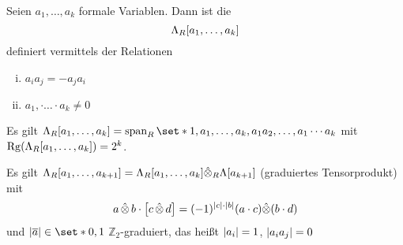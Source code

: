 \begin{definition}
	Seien $a_1, \ldots ,a_k$ formale Variablen.
	Dann ist die  
	\[
		\Lambda_R \benbrace*{a_1, \ldots ,a_k}
	\]
	definiert vermittels der Relationen 
	\begin{enumerate}[(i)]
		\item $a_i a_j = - a_j a_i$
		\item $a_1, \cdot \ldots \cdot a_k \neq 0$
	\end{enumerate}
	Es gilt $\Lambda_R \benbrace*{a_1, \ldots ,a_k} = \Span_R \set*{1, a_1, \ldots ,a_k, a_1 a_2, \ldots , a_1 \cdots a_k}$ mit $\Rg \enbrace*{\Lambda_R \benbrace*{a_1, \ldots ,a_k}} = 2^k$.
\end{definition}

Es gilt $\Lambda_R \benbrace*{a_1, \ldots ,a_{k+1}} = \Lambda_R \benbrace*{a_1, \ldots ,a_k} \hat{\otimes}_R \Lambda \benbrace*{a_{k+1}}$ (graduiertes Tensorprodukt) mit 
\[
	a \mathop{\hat{\otimes}} b \cdot \benbrace*{c \mathop{\hat{\otimes}} d} = (-1)^{\abs*{c} \cdot \abs*{b}} (a \cdot c) \hat{\otimes} (b \cdot d)
\]
und $\abs*{\overline{a}} \in \set*{0,1} $ $\mathbb{Z}_2$-graduiert, das heißt $\abs*{a_i}=1$, $\abs*{a_i a_j}=0 $

